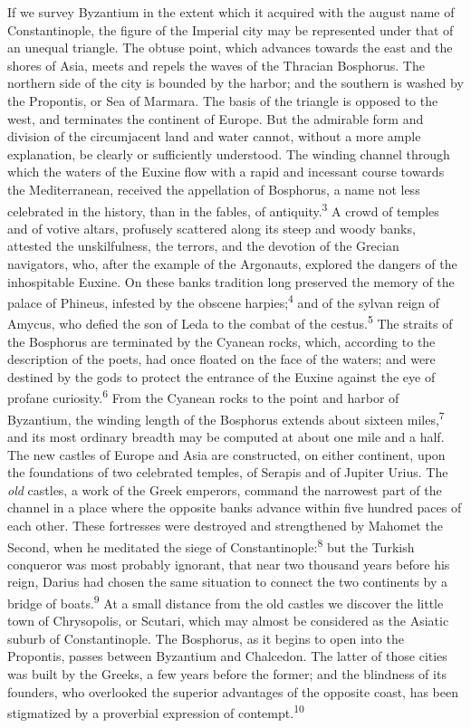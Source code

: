 If we survey Byzantium in the extent which it acquired with the
august name of Constantinople, the figure of the Imperial city
may be represented under that of an unequal triangle. The obtuse
point, which advances towards the east and the shores of Asia,
meets and repels the waves of the Thracian Bosphorus. The
northern side of the city is bounded by the harbor; and the
southern is washed by the Propontis, or Sea of Marmara. The basis
of the triangle is opposed to the west, and terminates the
continent of Europe. But the admirable form and division of the
circumjacent land and water cannot, without a more ample
explanation, be clearly or sufficiently understood. The winding
channel through which the waters of the Euxine flow with a rapid
and incessant course towards the Mediterranean, received the
appellation of Bosphorus, a name not less celebrated in the
history, than in the fables, of antiquity.\textsuperscript{3} A crowd of temples
and of votive altars, profusely scattered along its steep and
woody banks, attested the unskilfulness, the terrors, and the
devotion of the Grecian navigators, who, after the example of the
Argonauts, explored the dangers of the inhospitable Euxine. On
these banks tradition long preserved the memory of the palace of
Phineus, infested by the obscene harpies;\textsuperscript{4} and of the sylvan
reign of Amycus, who defied the son of Leda to the combat of the
cestus.\textsuperscript{5} The straits of the Bosphorus are terminated by the
Cyanean rocks, which, according to the description of the poets,
had once floated on the face of the waters; and were destined by
the gods to protect the entrance of the Euxine against the eye of
profane curiosity.\textsuperscript{6} From the Cyanean rocks to the point and
harbor of Byzantium, the winding length of the Bosphorus extends
about sixteen miles,\textsuperscript{7} and its most ordinary breadth may be
computed at about one mile and a half. The new castles of Europe
and Asia are constructed, on either continent, upon the
foundations of two celebrated temples, of Serapis and of Jupiter
Urius. The \textit{old} castles, a work of the Greek emperors, command
the narrowest part of the channel in a place where the opposite
banks advance within five hundred paces of each other. These
fortresses were destroyed and strengthened by Mahomet the Second,
when he meditated the siege of Constantinople:\textsuperscript{8} but the Turkish
conqueror was most probably ignorant, that near two thousand
years before his reign, Darius had chosen the same situation to
connect the two continents by a bridge of boats.\textsuperscript{9} At a small
distance from the old castles we discover the little town of
Chrysopolis, or Scutari, which may almost be considered as the
Asiatic suburb of Constantinople. The Bosphorus, as it begins to
open into the Propontis, passes between Byzantium and Chalcedon.
The latter of those cities was built by the Greeks, a few years
before the former; and the blindness of its founders, who
overlooked the superior advantages of the opposite coast, has
been stigmatized by a proverbial expression of contempt.\textsuperscript{10}

